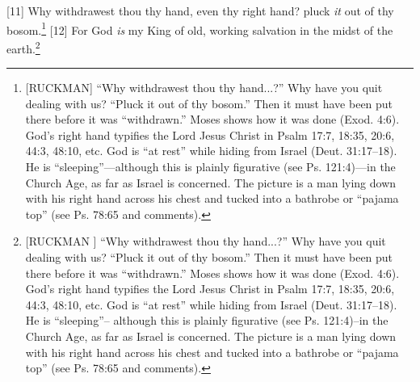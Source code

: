 [11] \textcolor[rgb]{0.00,0.00,1.00}{Why withdrawest thou thy hand, even thy right hand? pluck \emph{it} out of thy bosom.}\footnote{[RUCKMAN] “Why withdrawest thou thy hand...?” Why have you quit dealing with us? “Pluck it out of thy bosom.” Then it must have been put there before it was “withdrawn.” Moses shows how it was done (Exod. 4:6). God’s right hand typifies the Lord Jesus Christ in Psalm 17:7, 18:35, 20:6, 44:3, 48:10, etc. God is “at rest” while hiding from Israel (Deut. 31:17–18). He is “sleeping”—although this is plainly figurative (see Ps. 121:4)—in the Church Age, as far as Israel is concerned. The picture is a man lying down with his right hand across his chest and tucked into a bathrobe or “pajama top” (see Ps. 78:65 and comments).\cite{Ruckman1992Psalms}}
[12] \textcolor[rgb]{0.00,0.00,1.00}{For God \emph{is} my King of old, working salvation in the midst of the earth.}\footnote{[RUCKMAN ] “Why withdrawest thou thy hand...?” Why have you quit dealing with us? “Pluck it out of thy bosom.” Then it must have been put there before it was “withdrawn.” Moses shows how it was done (Exod. 4:6). God’s right hand typifies the Lord Jesus Christ in Psalm 17:7, 18:35, 20:6, 44:3, 48:10, etc. God is “at rest” while hiding from Israel (Deut. 31:17–18). He is “sleeping”-- although this is plainly figurative (see Ps. 121:4)--in the Church Age, as far as Israel is concerned. The picture is a man lying down with his right hand across his chest and tucked into a bathrobe or “pajama top” (see Ps. 78:65 and comments).\cite{Ruckman1992Psalms}}
